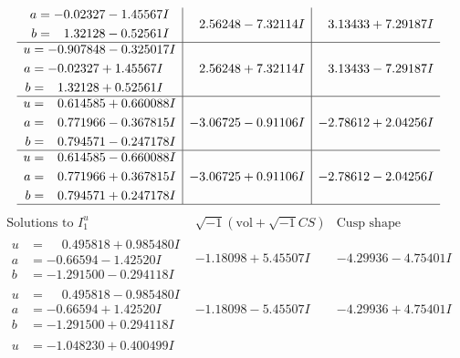 \documentclass[1p]{elsarticle_modified}
\theoremstyle{definition}
\newcommand{\I}{\sqrt{-1}}
\begin{document}
$$\begin{array}{c|c|c}
\begin{aligned}
a &= -0.02327 - 1.45567 I \\
b &= \phantom{-}1.32128 - 0.52561 I\end{aligned}
 & \phantom{-}2.56248 - 7.32114 I & \phantom{-}3.13433 + 7.29187 I \\ \hline\begin{aligned}
u &= -0.907848 - 0.325017 I \\
a &= -0.02327 + 1.45567 I \\
b &= \phantom{-}1.32128 + 0.52561 I\end{aligned}
 & \phantom{-}2.56248 + 7.32114 I & \phantom{-}3.13433 - 7.29187 I \\ \hline\begin{aligned}
u &= \phantom{-}0.614585 + 0.660088 I \\
a &= \phantom{-}0.771966 - 0.367815 I \\
b &= \phantom{-}0.794571 - 0.247178 I\end{aligned}
 & -3.06725 - 0.91106 I & -2.78612 + 2.04256 I \\ \hline\begin{aligned}
u &= \phantom{-}0.614585 - 0.660088 I \\
a &= \phantom{-}0.771966 + 0.367815 I \\
b &= \phantom{-}0.794571 + 0.247178 I\end{aligned}
 & -3.06725 + 0.91106 I & -2.78612 - 2.04256 I\\
 \hline 
 \end{array}$$\newpage$$\begin{array}{c|c|c}  
\text{Solutions to }I^u_{1}& \I (\text{vol} + \sqrt{-1}CS) & \text{Cusp shape}\\
 \hline 
\begin{aligned}
u &= \phantom{-}0.495818 + 0.985480 I \\
a &= -0.66594 - 1.42520 I \\
b &= -1.291500 - 0.294118 I\end{aligned}
 & -1.18098 + 5.45507 I & -4.29936 - 4.75401 I \\ \hline\begin{aligned}
u &= \phantom{-}0.495818 - 0.985480 I \\
a &= -0.66594 + 1.42520 I \\
b &= -1.291500 + 0.294118 I\end{aligned}
 & -1.18098 - 5.45507 I & -4.29936 + 4.75401 I \\ \hline\begin{aligned}
u &= -1.048230 + 0.400499 I \\

\end{aligned}
\end{array}$$
\end{document}
